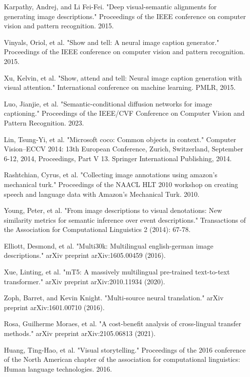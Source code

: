\documentclass[runningheads]{llncs}
\begin{document}
\begin{thebibliography}{8}
Karpathy, Andrej, and Li Fei-Fei. "Deep visual-semantic alignments for generating image descriptions." Proceedings of the IEEE conference on computer vision and pattern recognition. 2015.

Vinyals, Oriol, et al. "Show and tell: A neural image caption generator." Proceedings of the IEEE conference on computer vision and pattern recognition. 2015.

Xu, Kelvin, et al. "Show, attend and tell: Neural image caption generation with visual attention." International conference on machine learning. PMLR, 2015.

Luo, Jianjie, et al. "Semantic-conditional diffusion networks for image captioning." Proceedings of the IEEE/CVF Conference on Computer Vision and Pattern Recognition. 2023.

Lin, Tsung-Yi, et al. "Microsoft coco: Common objects in context." Computer Vision–ECCV 2014: 13th European Conference, Zurich, Switzerland, September 6-12, 2014, Proceedings, Part V 13. Springer International Publishing, 2014.

Rashtchian, Cyrus, et al. "Collecting image annotations using amazon’s mechanical turk." Proceedings of the NAACL HLT 2010 workshop on creating speech and language data with Amazon’s Mechanical Turk. 2010.

Young, Peter, et al. "From image descriptions to visual denotations: New similarity metrics for semantic inference over event descriptions." Transactions of the Association for Computational Linguistics 2 (2014): 67-78.

Elliott, Desmond, et al. "Multi30k: Multilingual english-german image descriptions." arXiv preprint arXiv:1605.00459 (2016).

Xue, Linting, et al. "mT5: A massively multilingual pre-trained text-to-text transformer." arXiv preprint arXiv:2010.11934 (2020).

Zoph, Barret, and Kevin Knight. "Multi-source neural translation." arXiv preprint arXiv:1601.00710 (2016).

Rosa, Guilherme Moraes, et al. "A cost-benefit analysis of cross-lingual transfer methods." arXiv preprint arXiv:2105.06813 (2021).

Huang, Ting-Hao, et al. "Visual storytelling." Proceedings of the 2016 conference of the North American chapter of the association for computational linguistics: Human language technologies. 2016.


\end{thebibliography}
\end{document}
